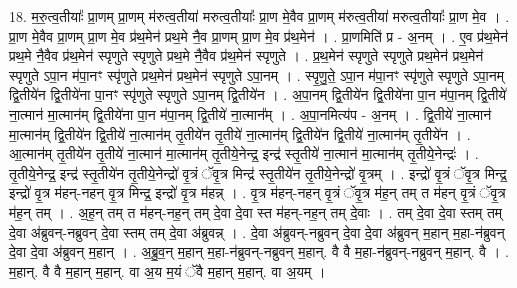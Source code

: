 \documentclass[17pt]{extarticle}
\begin{document}
18. म॒रु॒त्व॒तीयाः᳚ प्रा॒णम् प्रा॒णम् म॑रुत्व॒तीया॑ मरुत्व॒तीयाः᳚ प्रा॒ण मे॒वैव प्रा॒णम् म॑रुत्व॒तीया॑ मरुत्व॒तीयाः᳚ प्रा॒ण मे॒व । . प्रा॒ण मे॒वैव प्रा॒णम् प्रा॒ण मे॒व प्र॑थ॒मेन॑ प्रथ॒मे नै॒व प्रा॒णम् प्रा॒ण मे॒व प्र॑थ॒मेन॑ । . प्रा॒णमिति॑ प्र - अ॒नम् । . ए॒व प्र॑थ॒मेन॑ प्रथ॒मे नै॒वैव प्र॑थ॒मेन॑ स्पृणुते स्पृणुते प्रथ॒मे नै॒वैव प्र॑थ॒मेन॑ स्पृणुते । . प्र॒थ॒मेन॑ स्पृणुते स्पृणुते प्रथ॒मेन॑ प्रथ॒मेन॑ स्पृणुते ऽपा॒न म॑पा॒नꣳ स्पृ॑णुते प्रथ॒मेन॑ प्रथ॒मेन॑ स्पृणुते ऽपा॒नम् । . स्पृ॒णु॒ते॒ ऽपा॒न म॑पा॒नꣳ स्पृ॑णुते स्पृणुते ऽपा॒नम् द्वि॒तीये॑न द्वि॒तीये॑ना पा॒नꣳ स्पृ॑णुते स्पृणुते ऽपा॒नम् द्वि॒तीये॑न । . अ॒पा॒नम् द्वि॒तीये॑न द्वि॒तीये॑ना पा॒न म॑पा॒नम् द्वि॒तीये॑ ना॒त्मान॑ मा॒त्मान॑म् द्वि॒तीये॑ना पा॒न म॑पा॒नम् द्वि॒तीये॑ ना॒त्मान᳚म् । . अ॒पा॒नमित्य॑प - अ॒नम् । . द्वि॒तीये॑ ना॒त्मान॑ मा॒त्मान॑म् द्वि॒तीये॑न द्वि॒तीये॑ ना॒त्मान॑म् तृ॒तीये॑न तृ॒तीये॑ ना॒त्मान॑म् द्वि॒तीये॑न द्वि॒तीये॑ ना॒त्मान॑म् तृ॒तीये॑न । . आ॒त्मान॑म् तृ॒तीये॑न तृ॒तीये॑ ना॒त्मान॑ मा॒त्मान॑म् तृ॒तीये॒नेन्द्र॒ इन्द्र॑ स्तृ॒तीये॑ ना॒त्मान॑ मा॒त्मान॑म् तृ॒तीये॒नेन्द्रः॑ । . तृ॒तीये॒नेन्द्र॒ इन्द्र॑ स्तृ॒तीये॑न तृ॒तीये॒नेन्द्रो॑ वृ॒त्रं ॅवृ॒त्र मिन्द्र॑ स्तृ॒तीये॑न तृ॒तीये॒नेन्द्रो॑ वृ॒त्रम् । . इन्द्रो॑ वृ॒त्रं ॅवृ॒त्र मिन्द्र॒ इन्द्रो॑ वृ॒त्र म॑हन्-नहन् वृ॒त्र मिन्द्र॒ इन्द्रो॑ वृ॒त्र म॑हन्न् । . वृ॒त्र म॑हन्-नहन् वृ॒त्रं ॅवृ॒त्र म॑ह॒न् तम् त म॑हन् वृ॒त्रं ॅवृ॒त्र म॑ह॒न् तम् । . अ॒ह॒न् तम् त म॑हन्-नह॒न् तम् दे॒वा दे॒वा स्त म॑हन्-नह॒न् तम् दे॒वाः । . तम् दे॒वा दे॒वा स्तम् तम् दे॒वा अ॑ब्रुवन्-नब्रुवन् दे॒वा स्तम् तम् दे॒वा अ॑ब्रुवन्न् । . दे॒वा अ॑ब्रुवन्-नब्रुवन् दे॒वा दे॒वा अ॑ब्रुवन् म॒हान् म॒हा-न॑ब्रुवन् दे॒वा दे॒वा अ॑ब्रुवन् म॒हान् । . अ॒ब्रु॒व॒न् म॒हान् म॒हा-न॑ब्रुवन्-नब्रुवन् म॒हान्. वै वै म॒हा-न॑ब्रुवन्-नब्रुवन् म॒हान्. वै । . म॒हान्. वै वै म॒हान् म॒हान्. वा अ॒य म॒यं ॅवै म॒हान् म॒हान्. वा अ॒यम् । \newline
\end{document}
